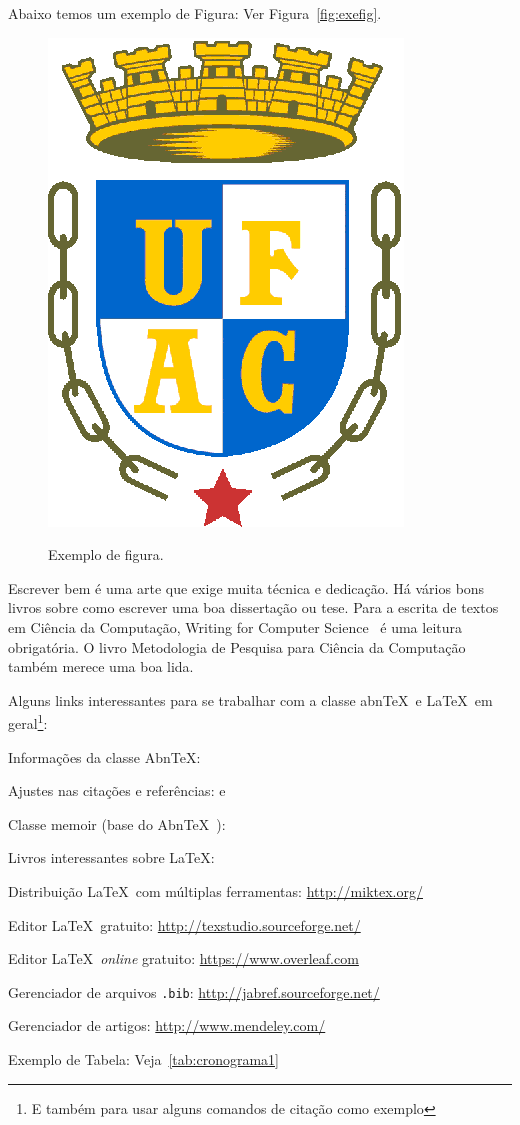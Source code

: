 \documentclass[
    12pt,				       %
    openright,			       %
    oneside,			       %
    a4paper,			       %
    chapter=TITLE,             %
    sumario=tradicional,       %
    english,			        %
    brazil, 				    %
 ]{abntex2}
\begin{document}
Abaixo temos um exemplo de Figura: Ver Figura~\autoref{fig:exefig}.

\begin{figure}[!ht]
    \centering
    \caption{Exemplo de figura.}
    \includegraphics[width=0.3\linewidth]{figuras/exefig.eps}
    \label{fig:exefig}
\end{figure}

Escrever bem é uma arte que exige muita técnica e dedicação. Há vários bons livros sobre como escrever uma boa dissertação ou tese. Para a escrita de textos em Ciência da Computação, Writing for Computer Science~\cite{zobel2014} é uma leitura obrigatória. O livro Metodologia de Pesquisa para Ciência da Computação~\cite{wazlawick2009} também merece uma boa lida.

Alguns links interessantes para se trabalhar com a classe abn\TeX\ e \LaTeX\ em geral\footnote{E também para usar alguns comandos de citação como exemplo}:
\begin{alineas}
    \item Informações da classe Abn\TeX: 
    \item Ajustes nas citações e referências:  e 
    \item Classe memoir (base do Abn\TeX\ ): 
    \item Livros interessantes sobre \LaTeX: \cite{Dongen2012,LeslieLamport90,FrankMittelbach111,Dongen2012}
    \item Distribuição \LaTeX\ com múltiplas ferramentas: \url{http://miktex.org/}
    \item Editor \LaTeX\ gratuito: \url{http://texstudio.sourceforge.net/}
    \item Editor \LaTeX\ \textit{online} gratuito: \url{https://www.overleaf.com}
    \item Gerenciador de arquivos \texttt{.bib}: \url{http://jabref.sourceforge.net/}
    \item Gerenciador de artigos: \url{http://www.mendeley.com/}
    \item Exemplo de Tabela: Veja~\autoref{tab:cronograma1}
\end{alineas}
\end{document}
